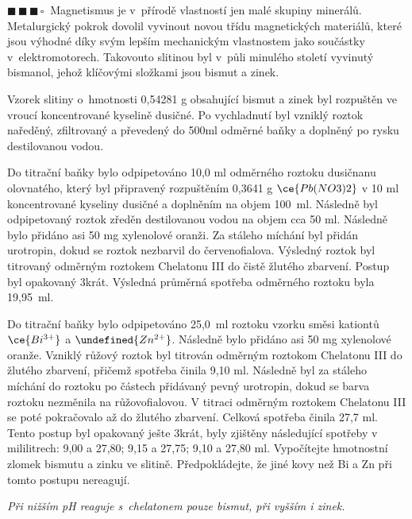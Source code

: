 \documentclass{book}
\let\ch\undefined
\newcommand{\tri}{$\blacksquare \, \blacksquare \, \blacksquare \, \square \; \; $}
\renewenvironment{quotation}{\par}{\par} %
\begin{document}
\hrulefill %
\begin{quotation}
\tri Magnetismus je v~přírodě vlastností jen malé skupiny minerálů.
Metalurgický pokrok dovolil vyvinout novou třídu magnetických materiálů,
které jsou výhodné díky svým lepším mechanickým vlastnostem jako
součástky v~elektromotorech. Takovouto slitinou byl v~půli minulého
století vyvinutý bismanol, jehož klíčovými složkami jsou bismut a
zinek. 

Vzorek slitiny o~hmotnosti 0,54281 g obsahující bismut a zinek byl
rozpuštěn ve vroucí koncentrované kyselině dusičné. Po vychladnutí
byl vzniklý roztok naředěný, zfiltrovaný a převedený do 500ml
odměrné baňky a doplněný po rysku destilovanou vodou. 

Do titrační baňky bylo odpipetováno 10,0 ml odměrného roztoku dusičnanu
olovnatého, který byl připravený rozpuštěním 0,3641 g $\ce{Pb(NO3)2}$
v 10 ml koncentrované kyseliny dusičné a doplněním na objem 100~ml. Následně byl odpipetovaný roztok zředěn destilovanou vodou na objem cca 50 ml. Následně bylo
přidáno asi 50 mg xylenolové oranži. Za stáleho míchání byl přidán
urotropin, dokud se roztok nezbarvil do červenofialova. Výsledný roztok
byl titrovaný odměrným roztokem Chelatonu III do čistě žlutého zbarvení.
Postup byl opakovaný 3krát. Výsledná průměrná spotřeba odměrného
roztoku byla 19,95~ml. 

Do titrační baňky bylo odpipetováno 25,0~ml roztoku vzorku směsi kationtů $\ce{Bi^{3+}}$ a $\ch{Zn^{2+}}$. Následně bylo přidáno
asi 50 mg xylenolové oranže. Vzniklý růžový roztok byl titrován
odměrným roztokom Chelatonu III do žlutého zbarvení, přičemž spotřeba
činila 9,10 ml. Následně byl za stáleho míchání do roztoku po částech
přidávaný pevný urotropin, dokud se barva roztoku nezměnila na růžovo\-fialovou.
V titraci odměrným roztokem Chelatonu III se poté pokračovalo až
do žlutého zbarvení. Celková spotřeba činila 27,7 ml. Tento postup byl
opakovaný ješte 3krát, byly zjištěny následující spotřeby v~ mililitrech: 9,00 a 27,80; 9,15
a 27,75; 9,10 a 27,80 ml. Vypočítejte hmotnostní zlomek bismutu a
zinku ve slitině. Předpokládejte, že jiné kovy než Bi a Zn při tomto
postupu nereagují. 

\textit{Při nižším pH reaguje s~chelatonem pouze bismut, při vyšším i zinek.}
\end{quotation} \dotfill \par 
\end{document}
